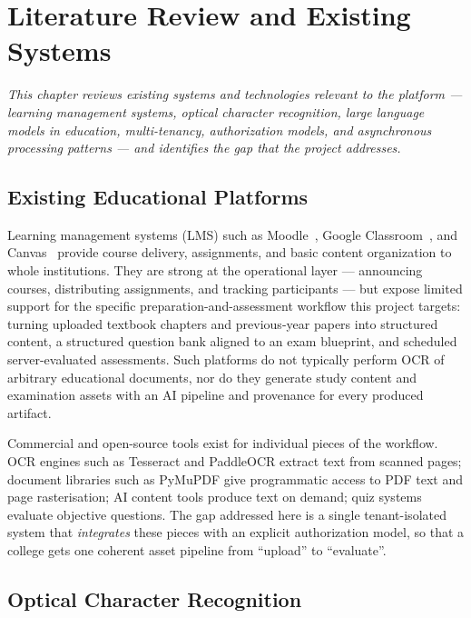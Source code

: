 \chapter{Literature Review and Existing Systems}
\label{ch:literature-review}

\begin{center}
\textit{This chapter reviews existing systems and technologies relevant to
the platform --- learning management systems, optical character recognition,
large language models in education, multi-tenancy, authorization models, and
asynchronous processing patterns --- and identifies the gap that the project
addresses.}
\end{center}

\vspace*{\fill}
\clearpage
\section{Existing Educational Platforms}

Learning management systems (LMS) such as Moodle~\cite{moodle}, Google
Classroom~\cite{gclassroom}, and Canvas~\cite{canvas} provide course delivery,
assignments, and basic content organization to whole institutions. They are
strong at the operational layer --- announcing courses, distributing
assignments, and tracking participants --- but expose limited support for the
specific preparation-and-assessment workflow this project targets: turning
uploaded textbook chapters and previous-year papers into structured content,
a structured question bank aligned to an exam blueprint, and scheduled
server-evaluated assessments. Such platforms do not typically perform OCR of
arbitrary educational documents, nor do they generate study content and
examination assets with an AI pipeline and provenance for every produced
artifact.

Commercial and open-source tools exist for individual pieces of the workflow.
OCR engines such as Tesseract and PaddleOCR extract text from scanned pages;
document libraries such as PyMuPDF give programmatic access to PDF text and
page rasterisation; AI content tools produce text on demand; quiz systems
evaluate objective questions. The gap addressed here is a single
tenant-isolated system that \emph{integrates} these pieces with an explicit
authorization model, so that a college gets one coherent asset pipeline from
``upload'' to ``evaluate''.

\section{Optical Character Recognition}

